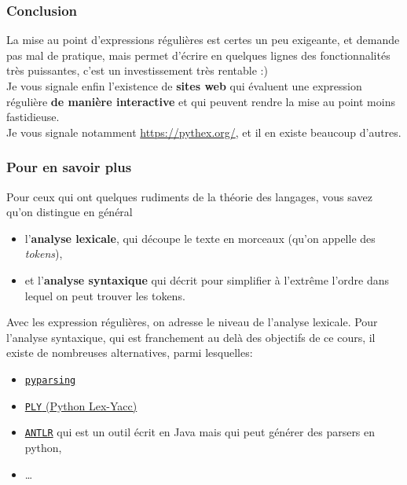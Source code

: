     \hypertarget{conclusion}{%
\subsubsection{Conclusion}\label{conclusion}}

    La mise au point d'expressions régulières est certes un peu exigeante,
et demande pas mal de pratique, mais permet d'écrire en quelques lignes
des fonctionnalités très puissantes, c'est un investissement très
rentable :)\\

    Je vous signale enfin l'existence de \textbf{sites web} qui évaluent une
expression régulière \textbf{de manière interactive} et qui peuvent
rendre la mise au point moins fastidieuse.\\

Je vous signale notamment \href{https://pythex.org/}{https://pythex.org/}, et il en existe beaucoup
d'autres.

    \hypertarget{pour-en-savoir-plus}{%
\subsubsection{Pour en savoir plus}\label{pour-en-savoir-plus}}

    Pour ceux qui ont quelques rudiments de la théorie des langages, vous
savez qu'on distingue en général

\begin{itemize}
	\item 
	l'\textbf{analyse lexicale}, qui
	découpe le texte en morceaux (qu'on appelle des \emph{tokens}),
	\item
	et l'\textbf{analyse syntaxique} qui décrit pour simplifier à l'extrême
	l'ordre dans lequel on peut trouver les tokens.
\end{itemize}

Avec les expression régulières, on adresse le niveau de l'analyse
lexicale. Pour l'analyse syntaxique, qui est franchement au delà des
objectifs de ce cours, il existe de nombreuses alternatives, parmi
lesquelles:

\begin{itemize}
	\item 
	\href{http://pyparsing.wikispaces.com/Download+and+Installation}{\texttt{pyparsing}}
	\item
	\href{http://www.dabeaz.com/ply/}{\texttt{PLY} (Python Lex-Yacc)}
	\item
	\href{http://www.antlr.org}{\texttt{ANTLR}} qui est un outil écrit en
	Java mais qui peut générer des parsers en python,
	\item
	\ldots{}
\end{itemize}
